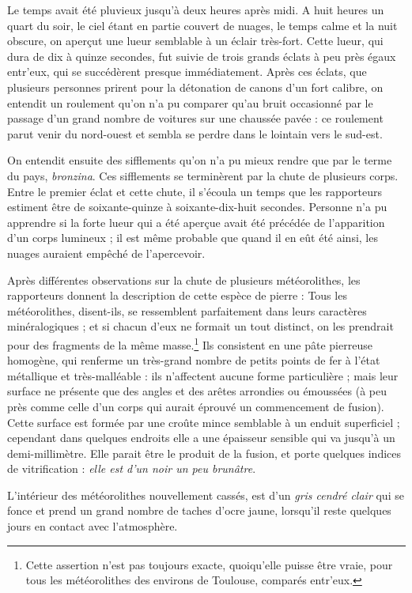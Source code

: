 \documentclass[a4paper, 12pt, oneside, french]{article}
\begin{document}
\og Le temps avait été pluvieux jusqu'à deux heures après midi. A huit heures un quart du soir, le ciel étant en partie couvert de nuages, le temps calme et la nuit obscure, on aperçut une lueur semblable à un éclair très-fort. Cette lueur, qui dura de dix à quinze secondes, fut suivie de trois grands éclats à peu près égaux entr'eux, qui se succédèrent presque immédiatement. Après ces éclats, que plusieurs personnes prirent pour la détonation de canons d'un fort calibre, on entendit un roulement qu'on n'a pu comparer qu'au bruit occasionné par le passage d'un grand nombre de voitures sur une chaussée pavée : ce roulement parut venir du nord-ouest et sembla se perdre dans le lointain vers le sud-est. \fg

\og On entendit ensuite des sifflements qu'on n'a pu mieux rendre que par le terme du pays, \emph{bronzina}. Ces sifflements se terminèrent par la chute de plusieurs corps. Entre le premier éclat et cette chute, il s'écoula un temps que les rapporteurs estiment être de soixante-quinze à soixante-dix-huit secondes. Personne n'a pu apprendre si la forte lueur qui a été aperçue avait été précédée de l'apparition d'un corps lumineux ; il est même probable que quand il en eût été ainsi, les nuages auraient empêché de l'apercevoir. \fg

\og Après différentes observations sur la chute de plusieurs météorolithes, les rapporteurs donnent la description de cette espèce de pierre : Tous les météorolithes, disent-ils, se ressemblent parfaitement dans leurs caractères minéralogiques ; et si chacun d'eux ne formait un tout distinct, on les prendrait pour des fragments de la même masse.\footnote{Cette assertion n'est pas toujours exacte, quoiqu'elle puisse être vraie, pour tous les météorolithes des environs de Toulouse, comparés entr'eux.} Ils consistent en une pâte pierreuse homogène, qui renferme un très-grand nombre de petits points de fer à l'état métallique et très-malléable : ils n'affectent aucune forme particulière ; mais leur surface ne présente que des angles et des arêtes arrondies ou émoussées (à peu près comme celle d'un corps qui aurait éprouvé un commencement de fusion). Cette surface est formée par une croûte mince semblable à un enduit superficiel ; cependant dans quelques endroits elle a une épaisseur sensible qui va jusqu'à un demi-millimètre. Elle parait être le produit de la fusion, et porte quelques indices de vitrification : \emph{elle est d'un noir un peu brunâtre}. \fg

\og L'intérieur des météorolithes nouvellement cassés, est d'un \emph{gris cendré clair} qui se fonce et prend un grand nombre de taches d'ocre jaune, lorsqu'il reste quelques jours en contact avec l'atmosphère. \fg
\end{document}
